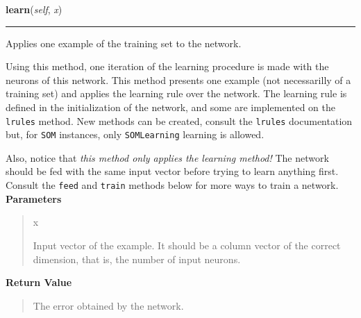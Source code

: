 \hspace{.8\funcindent}\begin{boxedminipage}{\funcwidth}

    \raggedright \textbf{learn}(\textit{self}, \textit{x})

    \vspace{-1.5ex}

    \rule{\textwidth}{0.5\fboxrule}
\setlength{\parskip}{2ex}

Applies one example of the training set to the network.

Using this method, one iteration of the learning procedure is made with
the neurons of this network. This method presents one example (not
necessarilly of a training set) and applies the learning rule over the
network. The learning rule is defined in the initialization of the
network, and some are implemented on the \texttt{lrules} method. New methods
can be created, consult the \texttt{lrules} documentation but, for
\texttt{SOM} instances, only \texttt{SOMLearning} learning is allowed.

Also, notice that \emph{this method only applies the learning method!} The
network should be fed with the same input vector before trying to learn
anything first. Consult the \texttt{feed} and \texttt{train} methods below for
more ways to train a network.
\setlength{\parskip}{1ex}
      \textbf{Parameters}
      \vspace{-1ex}

      \begin{quote}
        \begin{Ventry}{x}

          \item[x]


Input vector of the example. It should be a column vector of the
correct dimension, that is, the number of input neurons.
        \end{Ventry}

      \end{quote}

      \textbf{Return Value}
    \vspace{-1ex}

      \begin{quote}

The error obtained by the network.
      \end{quote}

    \end{boxedminipage}

    \label{peach:nn:nnet:SOM:feed}


